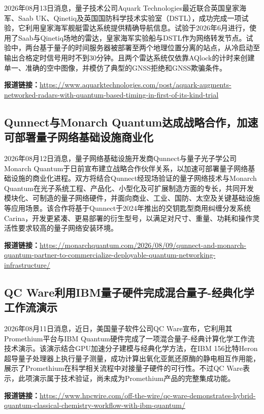 \documentclass[12pt,a4paper]{ctexart}
\begin{document}
2026年08月13日消息，量子技术公司Aquark Technologies最近联合英国皇家海军、Saab UK、Qinetiq及英国国防科学技术实验室（DSTL），成功完成一项试验，它利用皇家海军舰艇雷达系统提供精确导航信息。试验于2026年6月进行，使用了Saab与Qinetiq场地的雷达，皇家海军实验船与DSTL作为网络转发节点。试验中，两台基于量子的时间服务器被部署至两个地理位置分离的站点，从冷启动至输出合格定时信号用时不到30分钟。且两个雷达系统仅依靠AQlock的计时来创建单一、准确的空中图像，并模仿了典型的GNSS拒绝和GNSS欺骗条件。

\noindent\textbf{报道链接：}\url{https://www.aquarktechnologies.com/post/aquark-augments-networked-radars-with-quantum-based-timing-in-first-of-its-kind-trial}

\subsection{ Qunnect与Monarch Quantum达成战略合作，加速可部署量子网络基础设施商业化 }

2026年08月12日消息，量子网络基础设施开发商Qunnect与量子光子学公司Monarch Quantum于日前宣布建立战略合作伙伴关系，以加速可部署量子网络基础设施的商业化进程。双方将结合Qunnect经现场验证的量子网络技术与Monarch Quantum在光子系统工程、产品化、小型化及可扩展制造方面的专长，共同开发模块化、可制造的量子网络硬件，并面向商业、工业、国防、太空及关键基础设施等应用场景。该合作将基于Qunnect于2024年推出的交钥匙型商用纠缠分发系统Carina，开发更紧凑、更易部署的衍生型号，以满足对尺寸、重量、功耗和操作灵活性要求较高的量子网络安装环境。

\noindent\textbf{报道链接：}\url{https://monarchquantum.com/2026/08/09/qunnect-and-monarch-quantum-partner-to-commercialize-deployable-quantum-networking-infrastructure/}

\subsection{ QC Ware利用IBM量子硬件完成混合量子-经典化学工作流演示 }

2026年08月11日消息，近日，美国量子软件公司QC Ware宣布，它利用其Promethium平台与IBM Quantum硬件完成了一项混合量子-经典计算化学工作流技术演示。该演示结合GPU加速分子建模与经典化学方法，在IBM 156比特Heron超导量子处理器上执行量子测量，成功计算出氧化亚氮还原酶的静电相互作用能，展示了Promethium在科学相关流程中对接量子硬件的可行性。不过QC Ware表示，此项演示属于技术验证，尚未成为Promethium产品的完整集成功能。

\noindent\textbf{报道链接：}\url{https://www.hpcwire.com/off-the-wire/qc-ware-demonstrates-hybrid-quantum-classical-chemistry-workflow-with-ibm-quantum/}
\end{document}
